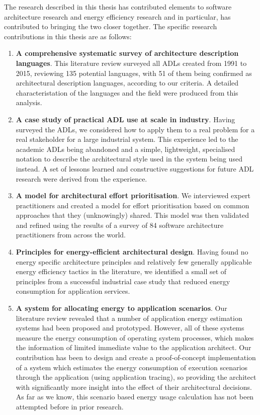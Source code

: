 The research described in this thesis has contributed elements to software architecture research and energy efficiency research and in particular, has contributed to bringing the two closer together.
\pagebreak
The specific research contributions in this thesis are as follows: \nopagebreak
\begin{enumerate}
	\item \textbf{A comprehensive systematic survey of architecture description languages}.  This literature review surveyed all ADLs created from 1991 to 2015, reviewing 135 potential languages, with 51 of them being confirmed as architectural description languages, according to our criteria.  A detailed characteristation of the languages and the field were produced from this analysis.
	\item \textbf{A case study of practical ADL use at scale in industry}.  Having surveyed the ADLs, we considered how to apply them to a real problem for a real stakeholder for a large industrial system.  This experience led to the academic ADLs being abandoned and a simple, lightweight, specialised notation to describe the architectural style used in the system being used instead.  A set of lessons learned and constructive suggestions for future ADL research were derived from the experience.
	\item \textbf{A model for architectural effort prioritisation}.  We interviewed expert practitioners and created a model for effort prioritisation based on common approaches that they (unknowingly) shared.  This model was then validated and refined using the results of a survey of 84 software architecture practitioners from across the world.
	\item \textbf{Principles for energy-efficient architectural design}.  Having found no energy specific architecture principles and relatively few generally applicable energy efficiency tactics in the literature, we identified a small set of principles from a successful industrial case study that reduced energy consumption for application services.
	\item \textbf{A system for allocating energy to application scenarios}.  Our literature review revealed that a number of application energy estimation systems had been proposed and prototyped.  However, all of these systems measure the energy consumption of operating system processes, which makes the information of limited immediate value to the application architect.  Our contribution has been to design and create a proof-of-concept implementation of a system which estimates the energy consumption of execution scenarios through the application (using application tracing), so providing the architect with significantly more insight into the effect of their architectural decisions. As far as we know, this scenario based energy usage calculation has not been attempted before in prior research.
\end{enumerate}

